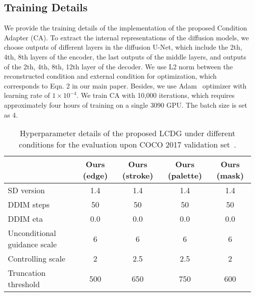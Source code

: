 \documentclass{article}
\begin{document}
\subsection{Training Details}
We provide the training details of the implementation of the proposed Condition Adapter (CA). To extract the internal representations of the diffusion models, we choose outputs of different layers in the diffusion U-Net, which include the 2th, 4th, 8th layers of the encoder, the last outputs of the middle layers, and outputs of the 2th, 4th, 8th, 12th layer of the decoder. We use L2 norm between the reconstructed condition and external condition for optimization, which corresponds to Eqn. 2 in our main paper. Besides, we use Adam~\cite{DBLP:journals/corr/KingmaB14} optimizer with learning rate of $1\times10^{-4}$. We train CA with 10,000 iterations, which requires approximately four hours of training on a single 3090 GPU. The batch size is set as $4$.

\begin{table}[t]
    \centering
\caption{Hyperparameter details of the proposed LCDG under different conditions for the evaluation upon COCO 2017 validation set~\cite{lin2014microsoft}.}
\begin{tabular}{lcccc}
     \toprule
     &Ours (edge) &Ours (stroke)&Ours (palette)&Ours (mask)\\
     \midrule
     SD version    & 1.4 & 1.4 & 1.4 & 1.4 \\ 
     DDIM steps    & 50 & 50 & 50 & 50 \\
     DDIM eta    & 0.0 & 0.0 & 0.0 & 0.0 \\
     Unconditional guidance scale    & 6 & 6 & 6 & 6 \\
     Controlling scale    & 2 & 2.5 & 2.5 & 2 \\
     Truncation threshold    & 500 & 650 & 750 & 600 \\
\bottomrule
\end{tabular}
    \label{table:hyperparameter details of LCDG}
\end{table}
\end{document}
